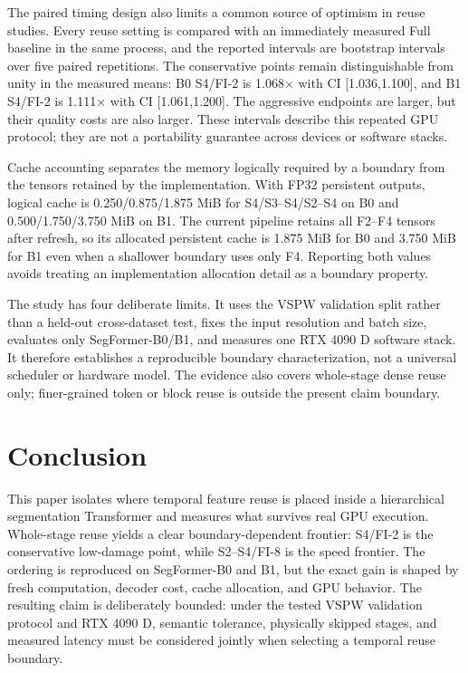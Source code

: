 \documentclass{article}
\begin{document}
The paired timing design also limits a common source of optimism in reuse studies. Every reuse setting is compared with an immediately measured Full baseline in the same process, and the reported intervals are bootstrap intervals over five paired repetitions. The conservative points remain distinguishable from unity in the measured means: B0 S4/FI-2 is 1.068$\times$ with CI [1.036,1.100], and B1 S4/FI-2 is 1.111$\times$ with CI [1.061,1.200]. The aggressive endpoints are larger, but their quality costs are also larger. These intervals describe this repeated GPU protocol; they are not a portability guarantee across devices or software stacks.

Cache accounting separates the memory logically required by a boundary from the tensors retained by the implementation. With FP32 persistent outputs, logical cache is 0.250/0.875/1.875 MiB for S4/S3--S4/S2--S4 on B0 and 0.500/1.750/3.750 MiB on B1. The current pipeline retains all F2--F4 tensors after refresh, so its allocated persistent cache is 1.875 MiB for B0 and 3.750 MiB for B1 even when a shallower boundary uses only F4. Reporting both values avoids treating an implementation allocation detail as a boundary property.

The study has four deliberate limits. It uses the VSPW validation split rather than a held-out cross-dataset test, fixes the input resolution and batch size, evaluates only SegFormer-B0/B1, and measures one RTX 4090 D software stack. It therefore establishes a reproducible boundary characterization, not a universal scheduler or hardware model. The evidence also covers whole-stage dense reuse only; finer-grained token or block reuse is outside the present claim boundary.

\section{Conclusion}
This paper isolates where temporal feature reuse is placed inside a hierarchical segmentation Transformer and measures what survives real GPU execution. Whole-stage reuse yields a clear boundary-dependent frontier: S4/FI-2 is the conservative low-damage point, while S2--S4/FI-8 is the speed frontier. The ordering is reproduced on SegFormer-B0 and B1, but the exact gain is shaped by fresh computation, decoder cost, cache allocation, and GPU behavior. The resulting claim is deliberately bounded: under the tested VSPW validation protocol and RTX 4090 D, semantic tolerance, physically skipped stages, and measured latency must be considered jointly when selecting a temporal reuse boundary.

\clearpage


\end{document}
